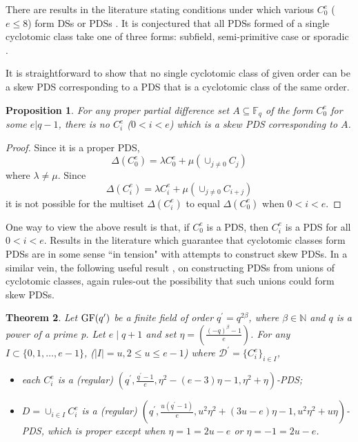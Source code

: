 \documentclass[12pt, a4paper]{article}
\newtheorem{theorem}{Theorem}[section]
\newtheorem{proposition}[theorem]{Proposition}
\theoremstyle{definition}
\begin{document}
There are results in the literature stating conditions under which various $C_0^e$ ($e \leq 8$) form DSs or PDSs \cite{HucJoh, Ma84, Ma94, MomWanXia, Sto}.  It is conjectured that all PDSs formed of a single cyclotomic class take one of three forms: subfield, semi-primitive case or sporadic \cite{MomWanXia}.

It is straightforward to show that no single cyclotomic class of given order can be a skew PDS corresponding to a PDS that is a cyclotomic class of the same order. 

\begin{proposition}\label{prop:noC_iskewPDS}
For any proper partial difference set $A \subseteq \mathbb{F}_q$ of the form $C_0^e$ for some $e|q-1$, there is no $C_i^e$ ($0<i<e$) which is a skew PDS corresponding to $A$.
\end{proposition}
\begin{proof}
Since it is a proper PDS,
$$ \Delta(C_0^e)= \lambda C_0^e + \mu (\cup_{j \neq 0}C_j)$$
where $\lambda \neq \mu$.  Since
$$ \Delta(C_i^e)= \lambda C_i^e + \mu (\cup_{j \neq 0} C_{i+j})$$
it is not possible for the multiset $\Delta(C_i^e)$ to equal $\Delta(C_0^e)$ when $0<i<e$.
\end{proof}

One way to view the above result is that, if $C_0^e$ is a PDS, then $C_i^e$ is a PDS for all $0<i<e$.  Results in the literature which guarantee that cyclotomic classes form PDSs are in some sense ``in tension" with attempts to construct skew PDSs.  In a similar vein,  the following useful result \cite{CalKan, HucJoh, Ma94}, on constructing PDSs from unions of cyclotomic classes,  again rules-out the possibility that such unions could form skew PDSs.

\begin{theorem}
Let ${\rm GF}(q')$ be a finite field of order $q^{\prime} = q^{2\beta}$, where $\beta \in \mathbb{N}$ and $q$ is a power of a prime p. Let $e\mid{q+1}$ and set $\eta = \left(\frac{(-q)^{\beta}-1}{e}\right)$. For any $I \subset \{0,1,\ldots,e-1\}$, ($|I|=u, 2 \leq u \leq e-1$) where $\mathcal{D}^{\prime} = \{C_i^e\}_{i \in I}$, 
\begin{itemize}
\item[(i)] each $C_i^{e}$ is a (regular) $(q^{\prime},\frac{q^{\prime}-1}{e},\eta^2-(e-3)\eta-1,\eta^2+\eta)$-PDS;
\item[(ii)]  $D=\cup_{i \in I} C_i^e$ is a (regular) $(q^{\prime}, \frac{u(q^{\prime}-1)}{e}, u^2 \eta^2+(3u-e)\eta -1, u^2 \eta^2+u \eta)$-PDS, which is proper except when $\eta=1=2u-e$ or $\eta=-1=2u-e$.
\end{itemize}
\end{theorem} 
\end{document}
